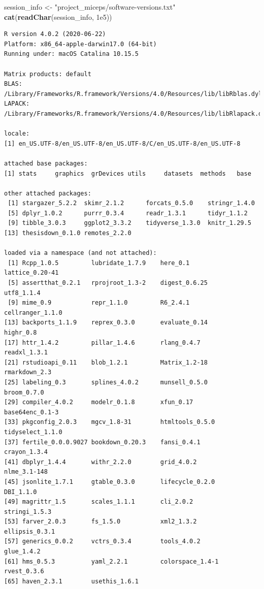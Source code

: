 \documentclass[12pt,twoside]{reedthesis}
\newenvironment{Shaded}{\begin{snugshade}}{\end{snugshade}}
\newcommand{\KeywordTok}[1]{\textcolor[rgb]{0.13,0.29,0.53}{\textbf{#1}}}
\newcommand{\FloatTok}[1]{\textcolor[rgb]{0.00,0.00,0.81}{#1}}
\newcommand{\StringTok}[1]{\textcolor[rgb]{0.31,0.60,0.02}{#1}}
\newcommand{\NormalTok}[1]{#1}
\begin{document}
\footnotesize
\begin{Shaded}
\begin{Highlighting}[]
\NormalTok{session_info <-}\StringTok{ "project_miceps/software-versions.txt"}
\KeywordTok{cat}\NormalTok{(}\KeywordTok{readChar}\NormalTok{(session_info, }\FloatTok{1e5}\NormalTok{))}
\end{Highlighting}
\end{Shaded}
\begin{verbatim}
R version 4.0.2 (2020-06-22)
Platform: x86_64-apple-darwin17.0 (64-bit)
Running under: macOS Catalina 10.15.5

Matrix products: default
BLAS:   /Library/Frameworks/R.framework/Versions/4.0/Resources/lib/libRblas.dylib
LAPACK: /Library/Frameworks/R.framework/Versions/4.0/Resources/lib/libRlapack.dylib

locale:
[1] en_US.UTF-8/en_US.UTF-8/en_US.UTF-8/C/en_US.UTF-8/en_US.UTF-8

attached base packages:
[1] stats     graphics  grDevices utils     datasets  methods   base     

other attached packages:
 [1] stargazer_5.2.2  skimr_2.1.2      forcats_0.5.0    stringr_1.4.0   
 [5] dplyr_1.0.2      purrr_0.3.4      readr_1.3.1      tidyr_1.1.2     
 [9] tibble_3.0.3     ggplot2_3.3.2    tidyverse_1.3.0  knitr_1.29.5    
[13] thesisdown_0.1.0 remotes_2.2.0   

loaded via a namespace (and not attached):
 [1] Rcpp_1.0.5         lubridate_1.7.9    here_0.1           lattice_0.20-41   
 [5] assertthat_0.2.1   rprojroot_1.3-2    digest_0.6.25      utf8_1.1.4        
 [9] mime_0.9           repr_1.1.0         R6_2.4.1           cellranger_1.1.0  
[13] backports_1.1.9    reprex_0.3.0       evaluate_0.14      highr_0.8         
[17] httr_1.4.2         pillar_1.4.6       rlang_0.4.7        readxl_1.3.1      
[21] rstudioapi_0.11    blob_1.2.1         Matrix_1.2-18      rmarkdown_2.3     
[25] labeling_0.3       splines_4.0.2      munsell_0.5.0      broom_0.7.0       
[29] compiler_4.0.2     modelr_0.1.8       xfun_0.17          base64enc_0.1-3   
[33] pkgconfig_2.0.3    mgcv_1.8-31        htmltools_0.5.0    tidyselect_1.1.0  
[37] fertile_0.0.0.9027 bookdown_0.20.3    fansi_0.4.1        crayon_1.3.4      
[41] dbplyr_1.4.4       withr_2.2.0        grid_4.0.2         nlme_3.1-148      
[45] jsonlite_1.7.1     gtable_0.3.0       lifecycle_0.2.0    DBI_1.1.0         
[49] magrittr_1.5       scales_1.1.1       cli_2.0.2          stringi_1.5.3     
[53] farver_2.0.3       fs_1.5.0           xml2_1.3.2         ellipsis_0.3.1    
[57] generics_0.0.2     vctrs_0.3.4        tools_4.0.2        glue_1.4.2        
[61] hms_0.5.3          yaml_2.2.1         colorspace_1.4-1   rvest_0.3.6       
[65] haven_2.3.1        usethis_1.6.1     
\end{verbatim}
\normalsize
\end{document}
